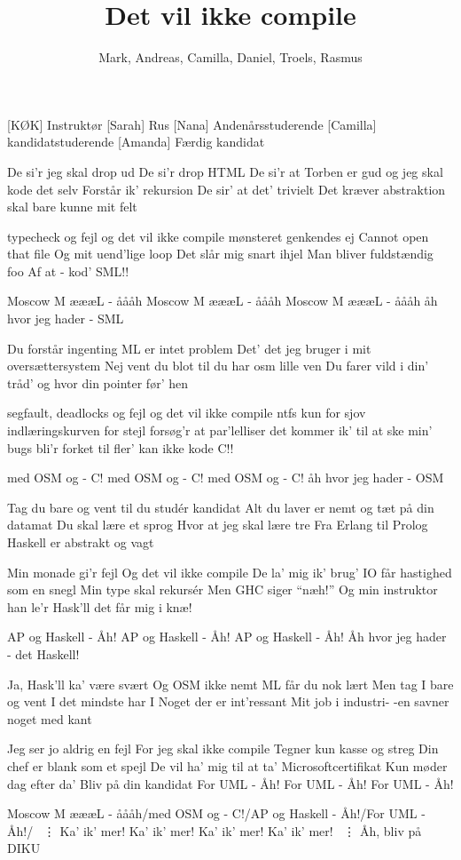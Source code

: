 \documentclass[a4paper,11pt]{article}
\title{Det vil ikke compile}
\author{Mark, Andreas, Camilla, Daniel, Troels, Rasmus}
\begin{document}
\maketitle

\begin{roles}  
[KØK] Instruktør
[Sarah] Rus
[Nana] Andenårsstuderende
[Camilla] kandidatstuderende
[Amanda] Færdig kandidat
\end{roles}

\begin{song}

De si'r jeg skal drop ud
De si'r drop HTML
De si'r at Torben er gud
og jeg skal kode det selv
Forstår ik' rekursion
De sir' at det' trivielt
Det kræver abstraktion
skal bare kunne mit felt

typecheck og fejl
og det vil ikke compile
mønsteret genkendes ej
Cannot open that file
Og mit uend'lige loop 
Det slår mig snart ihjel
Man bliver fuldstændig foo
Af at - kod' SML!!

Moscow M æææL - åååh
Moscow M æææL - åååh
Moscow M æææL - åååh
åh hvor jeg hader - SML


Du forstår ingenting
ML er intet problem
Det' det jeg bruger i
mit oversættersystem
Nej vent du blot til du
har osm lille ven
Du farer vild i din' tråd'
og hvor din pointer før' hen


segfault, deadlocks og fejl
og det vil ikke compile
ntfs kun for sjov
indlæringskurven for stejl
forsøg'r at par'lelliser
det kommer ik' til at ske
min' bugs bli'r forket til fler'
kan ikke kode C!!

med OSM og - C!
med OSM og - C!
med OSM og - C!
åh hvor jeg hader - OSM


Tag du bare og vent
til du studér kandidat
Alt du laver er nemt
og tæt på din datamat
Du skal lære et sprog
Hvor at jeg skal lære tre
Fra Erlang til Prolog
Haskell er abstrakt og vagt

Min monade gi'r fejl
Og det vil ikke compile
De la' mig ik' brug' IO
får hastighed som en snegl
Min type skal rekursér
Men GHC siger "`næh!"'
Og min instruktor han le'r
Hask'll det får mig i knæ!

AP og Haskell - Åh!
AP og Haskell - Åh!
AP og Haskell - Åh!
Åh hvor jeg hader - det Haskell!


Ja, Hask'll ka' være svært
Og OSM ikke nemt
ML får du nok lært
Men tag I bare og vent
I det mindste har I
Noget der er int'ressant
Mit job i industri-
-en savner noget med kant

Jeg ser jo aldrig en fejl
For jeg skal ikke compile
Tegner kun kasse og streg
Din chef er blank som et spejl
De vil ha' mig til at ta'
Microsoftcertifikat
Kun møder dag efter da'
Bliv på din kandidat
For UML - Åh!
For UML - Åh!
For UML - Åh!

Moscow M æææL - åååh/med OSM og - C!/AP og Haskell - Åh!/For UML - Åh!/
\ \vdots
{}
Ka' ik' mer!
Ka' ik' mer!
Ka' ik' mer!
Ka' ik' mer!
\ \vdots
Åh, bliv på DIKU

\end{song}
\end{document}
